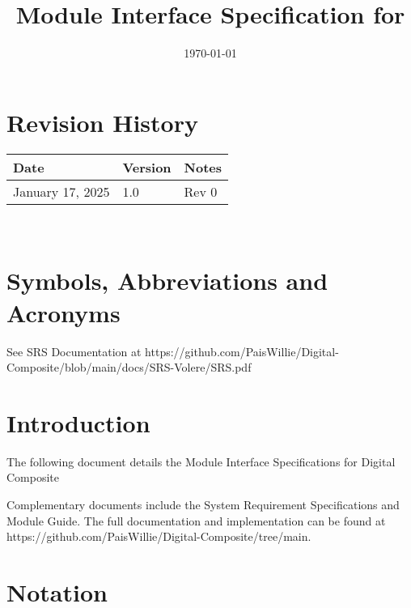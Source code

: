 \documentclass[12pt, titlepage]{article}
\begin{document}
\title{Module Interface Specification for \progname{}}

\author{\authname}

\date{\today}

\maketitle


\section{Revision History}

\begin{tabularx}{\textwidth}{p{3cm}p{2cm}X}
\toprule {\bf Date} & {\bf Version} & {\bf Notes}\\
\midrule
January 17, 2025 & 1.0 & Rev 0\\
\bottomrule
\end{tabularx}

~\newpage

\section{Symbols, Abbreviations and Acronyms}

See SRS Documentation at https://github.com/PaisWillie/Digital-Composite/blob/main/docs/SRS-Volere/SRS.pdf



\newpage

\tableofcontents

\newpage


\section{Introduction}

The following document details the Module Interface Specifications for
Digital Composite

Complementary documents include the System Requirement Specifications
and Module Guide.  The full documentation and implementation can be
found at https://github.com/PaisWillie/Digital-Composite/tree/main.

\section{Notation}
\label{SecNotation}
\end{document}

